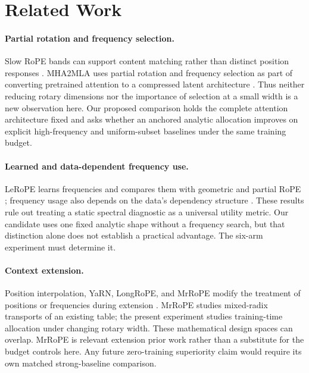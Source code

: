 \section{Related Work}
\label{sec:related}

\paragraph{Partial rotation and frequency selection.}
Slow RoPE bands can support content matching rather than distinct position
responses \citep{barbero2025round}. MHA2MLA uses partial rotation and frequency
selection as part of converting pretrained attention to a compressed latent
architecture \citep{ji2025mha2mla}. Thus neither reducing rotary dimensions
nor the importance of selection at a small width is a new observation here.
Our proposed comparison holds the complete attention architecture fixed and
asks whether an anchored analytic allocation improves on explicit high-frequency
and uniform-subset baselines under the same training budget.

\paragraph{Learned and data-dependent frequency use.}
LeRoPE learns frequencies and compares them with geometric and partial RoPE
\citep{karypis2026lerope}; frequency usage also depends on the data's dependency
structure \citep{wu2026datashapes}. These results rule out treating a static
spectral diagnostic as a universal utility metric. Our candidate uses one fixed
analytic shape without a frequency search, but that distinction alone does not
establish a practical advantage. The six-arm experiment must determine it.

\paragraph{Context extension.}
Position interpolation, YaRN, LongRoPE, and MrRoPE modify the treatment of
positions or frequencies during extension
\citep{chen2024position,peng2024yarn,ding2024longrope,tian2026mrrope}.
MrRoPE studies mixed-radix transports of an existing table; the present
experiment studies training-time allocation under changing rotary width.
These mathematical design spaces can overlap. MrRoPE is relevant extension
prior work rather than a substitute for the budget controls here. Any future
zero-training superiority claim would require its own matched strong-baseline
comparison.
